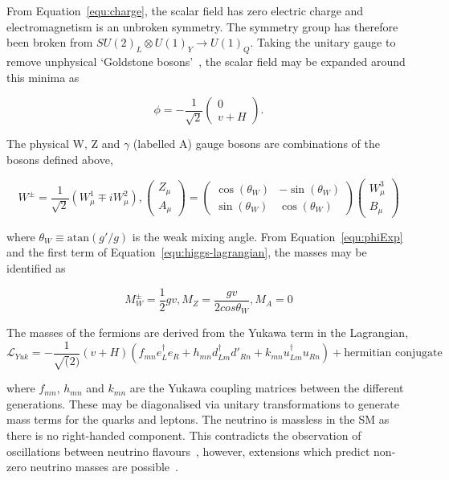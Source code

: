 From Equation~\ref{equ:charge}, the scalar field has zero electric charge and electromagnetism
is an unbroken symmetry. The symmetry group has therefore been broken 
from $SU(2)_L\otimes U(1)_Y \rightarrow U(1)_Q$. Taking the unitary gauge to remove unphysical `Goldstone 
bosons'~\cite{unitGauge}, the scalar field may be expanded around this minima as

\begin{equation}
\label{equ:phiExp}
\phi =  - \frac{1}{\sqrt{2}}\begin{pmatrix} 0 \\ v + H\end{pmatrix}.
\end{equation}

The physical W, Z and $\gamma$ (labelled A) gauge bosons are combinations of the 
bosons defined above,

\begin{equation}
W^{\pm} = \frac{1}{\sqrt{2}} (W^1_\mu \mp i W^2_\mu), \begin{pmatrix} Z_\mu \\ A_\mu\end{pmatrix} = \begin{pmatrix} \cos(\theta_W) & -\sin(\theta_W) \\ \sin(\theta_W) & \cos(\theta_W)\end{pmatrix} \begin{pmatrix} W^3_\mu \\ B_\mu\end{pmatrix}
\end{equation}

where $\theta_W \equiv \text{atan}(g'/g)$ is the weak mixing angle. From Equation~\ref{equ:phiExp} and
the first term of Equation~\ref{equ:higgs-lagrangian}, the masses may be identified as

\begin{equation}
M_W^\pm = \frac{1}{2}gv, M_Z = \frac{gv}{2cos\theta_W}, M_A = 0
\end{equation}

The masses of the fermions are derived from the Yukawa term in the Lagrangian, 
\begin{equation}
\mathcal{L}_{Yuk} = - \frac{1}{\sqrt(2)}(v + H)(f_{mn} e_L^{\dagger}e_R + h_{mn} d_{Lm}^{\dagger}d'_{Rn} + k_{mn} u_{Lm}^{\dagger}u_{Rn}) + \text{hermitian conjugate}
\end{equation}

where $f_{mn}$, $h_{mn}$ and $k_{mn}$ are the Yukawa coupling matrices between the different generations. These may be diagonalised via unitary transformations
to generate mass terms for the quarks and leptons. The neutrino is massless in the SM as there is no right-handed component.
This contradicts the observation of oscillations between neutrino flavours~\cite{neutOsc},
however, extensions which predict non-zero neutrino masses are possible~\cite{neutM}. 

